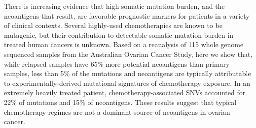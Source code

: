 There is increasing evidence that high somatic mutation burden, and the neoantigens that result, are favorable prognostic markers for patients in a variety of clinical contexts. Several highly-used chemotherapies are known to be mutagenic, but their contribution to detectable somatic mutation burden in treated human cancers is unknown. Based on a reanalysis of 115 whole genome sequenced samples from the Australian Ovarian Cancer Study, here we show that, while relapsed samples have 65\% more potential neoantigens than primary samples, less than 5\% of the mutations and neoantigens are typically attributable to experimentally-derived mutational signatures of chemotherapy exposure. In an extremely heavily treated patient, chemotherapy-associated SNVs accounted for 22\% of mutations and 15\% of neoantigens. These results suggest that typical chemotherapy regimes are not a dominant source of neoantigens in ovarian cancer.


